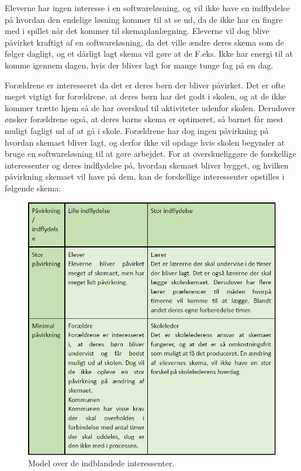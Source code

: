 Eleverne har ingen interesse i en softwareløsning, og vil ikke have en indflydelse på hvordan den endelige løsning kommer til at se ud, da de ikke har en fingre med i spillet når det kommer til skemaplanlægning. Eleverne vil dog blive påvirket kraftigt af en softwareløsning, da det ville ændre deres skema som de følger dagligt, og et dårligt lagt skema vil gøre at de F.eks. Ikke har energi til at komme igennem dagen, hvis der bliver lagt for mange tunge fag på en dag.

Forældrene er interesseret da det er deres børn der bliver påvirket. Det er ofte meget vigtigt for forældrene, at deres børn har det godt i skolen, og at de ikke kommer trætte hjem så de har overskud til aktiviteter udenfor skolen. Derudover ønsker forældrene også, at deres barns skema er optimeret, så barnet får mest muligt fagligt ud af at gå i skole. Forældrene har dog ingen påvirkning på hvordan skemaet bliver lagt, og derfor ikke vil opdage hvis skolen begynder at bruge en softwareløsning til at gøre arbejdet.
For at overskueliggøre de forskellige interessenter og deres indflydelse på, hvordan skemaet bliver bygget, og hvilken påvirkning skemaet vil have på dem, kan de forskellige interessenter opstilles i følgende skema:
\begin{figure}[!h]
  \centering
  \includegraphics[width=\textwidth]{partials/graphics/interessentanalyse.png}
  \caption{Model over de indblandede interessenter.}
  \label{fig:interessenter}
\end{figure}
